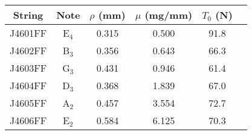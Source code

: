\begin{tabular}{cccccc}
\toprule
String & Note & $\rho$ (mm) & $\mu$ (mg/mm) & $T_0$ (N) \\
\midrule
J4601FF & E$_{4}$ & 0.315 & 0.500 & 91.8 \\
J4602FF & B$_{3}$ & 0.356 & 0.643 & 66.3 \\
J4603FF & G$_{3}$ & 0.431 & 0.946 & 61.4 \\
J4604FF & D$_{3}$ & 0.368 & 1.839 & 67.0 \\
J4605FF & A$_{2}$ & 0.457 & 3.554 & 72.7 \\
J4606FF & E$_{2}$ & 0.584 & 6.125 & 70.3 \\
\bottomrule
\end{tabular}

